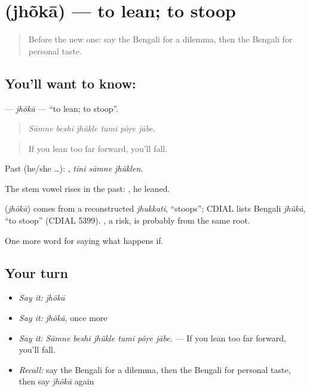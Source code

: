\section[\texorpdfstring{\bn{ঝোঁকা} (jhõkā)}{ঝোঁকা (jhõkā)}]{ (jhõkā) — to lean; to stoop}

\label{lesson:BN-C529-jhoka}



\begin{quote}
Before the new one: say the Bengali for a dilemma, then the Bengali for personal taste.
\end{quote}

\subsection*{You'll want to know: }
\textbf{} — \emph{jhõkā} — \textquotedblleft{}to lean; to stoop\textquotedblright{}.

\begin{quote}
     
\end{quote}

\begin{quote}
\emph{Sāmne beshi jhũkle tumi pôṛe jābe.}
\end{quote}

\begin{quote}
If you lean too far forward, you'll fall.
\end{quote}

Past (he/she …):   , \emph{tini sāmne jhũklen}.

The stem vowel rises in the past: , he leaned.

\begin{cousinweb}
\textbf{} (\emph{jhõkā}) comes from a reconstructed \emph{jhukkati}, \textquotedblleft{}stoops\textquotedblright{}; CDIAL lists Bengali \emph{jhũkā}, \textquotedblleft{}to stoop\textquotedblright{} (CDIAL 5399). , a risk, is probably from the same root.
\end{cousinweb}

\begin{grammarlens}[title={What you've built}]
One more word for saying what happens if.
\end{grammarlens}

\subsection*{Your turn}
\begin{itemize}
\raggedright
  \item \emph{Say it:} \emph{jhõkā}
  \item \emph{Say it:} \emph{jhõkā}, once more
  \item \emph{Say it:} \emph{Sāmne beshi jhũkle tumi pôṛe jābe.} — If you lean too far forward, you'll fall.
  \item \emph{Recall:} say the Bengali for a dilemma, then the Bengali for personal taste, then say \emph{jhõkā} again
\end{itemize}

